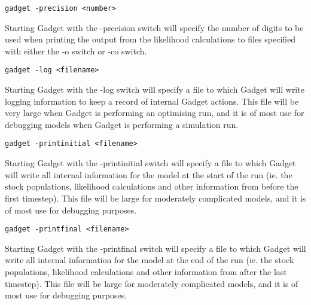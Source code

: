 \documentclass[10pt,twoside]{book}
\begin{document}


{\small\begin{verbatim}
gadget -precision <number>
\end{verbatim}}
Starting Gadget with the -precision switch will specify the number of digits to be used when printing the output from the likelihood calculations to files specified with either the -o switch or -co switch.

{\small\begin{verbatim}
gadget -log <filename>
\end{verbatim}}
Starting Gadget with the -log switch will specify a file to which Gadget will write logging information to keep a record of internal Gadget actions.  This file will be very large when Gadget is performing an optimising run, and it is of most use for debugging models when Gadget is performing a simulation run.

{\small\begin{verbatim}
gadget -printinitial <filename>
\end{verbatim}}
Starting Gadget with the -printinitial switch will specify a file to which Gadget will write all internal information for the model at the start of the run (ie. the stock populations, likelihood calculations and other information from before the first timestep).  This file will be large for moderately complicated models, and it is of most use for debugging purposes.

{\small\begin{verbatim}
gadget -printfinal <filename>
\end{verbatim}}
Starting Gadget with the -printfinal switch will specify a file to which Gadget will write all internal information for the model at the end of the run (ie. the stock populations, likelihood calculations and other information from after the last timestep).  This file will be large for moderately complicated models, and it is of most use for debugging purposes.
\end{document}
